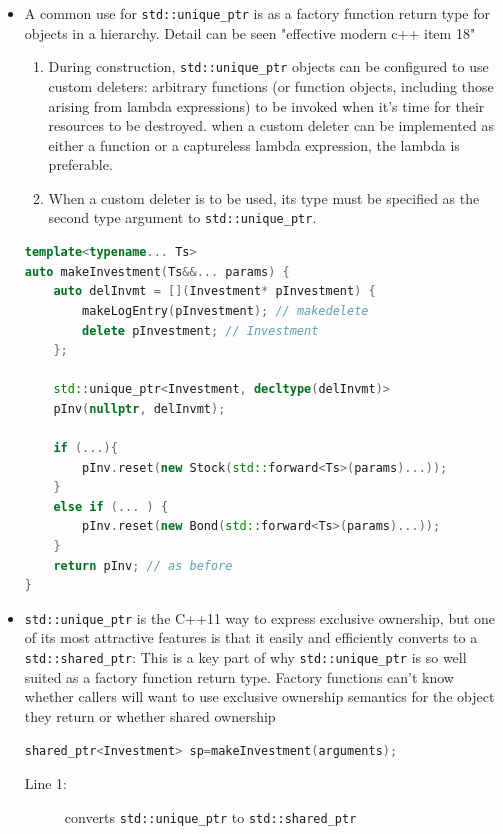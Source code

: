 \documentclass[a4paper,11pt,twoside]{book}
\begin{document}
\begin{itemize}
\item A common use for \texttt{std::unique\_ptr} is as a factory function return type for objects
in a hierarchy. Detail can be seen "effective modern c++ item 18"

\begin{enumerate}
\item During construction, \texttt{std::unique\_ptr} objects can be configured to use custom deleters: arbitrary functions (or function objects, including those arising from lambda expressions) to be invoked when it's time for their resources to be destroyed. when a custom deleter can be implemented as either a function or a captureless lambda expression, the lambda is preferable.

\item When a custom deleter is to be used, its type must be specified as the second type argument to \texttt{std::unique\_ptr}.
\end{enumerate}

\begin{lstlisting}[frame=single, language=c++, mathescape=true]
template<typename... Ts>
auto makeInvestment(Ts&&... params) {
	auto delInvmt = [](Investment* pInvestment) {
		makeLogEntry(pInvestment); // makedelete
		delete pInvestment; // Investment
	};

	std::unique_ptr<Investment, decltype(delInvmt)>
	pInv(nullptr, delInvmt);
	
	if (...){
		pInv.reset(new Stock(std::forward<Ts>(params)...));
	}
	else if (... ) {
		pInv.reset(new Bond(std::forward<Ts>(params)...));
	}
	return pInv; // as before
}
\end{lstlisting}

\item \texttt{std::unique\_ptr} is the C++11 way to express exclusive ownership, but one of its most attractive features is that it easily and efficiently converts to a \texttt{std::shared\_ptr}: This is a key part of why \texttt{std::unique\_ptr} is so well suited as a factory function return type. Factory functions can't know whether callers will want to use exclusive ownership semantics for the object they return or whether shared ownership
\begin{lstlisting}[frame=single, language=c++, mathescape=true]
shared_ptr<Investment> sp=makeInvestment(arguments); 
\end{lstlisting}
\begin{description}
	\item[Line 1:] converts \texttt{std::unique\_ptr} to \texttt{std::shared\_ptr}
\end{description}


\end{itemize}
\end{document}
